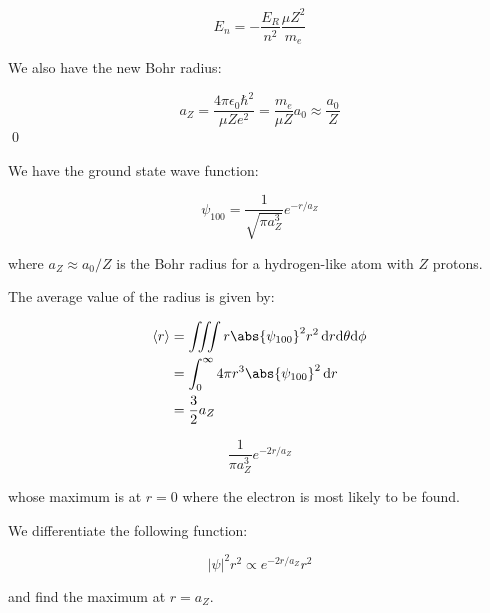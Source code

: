 \documentclass[12pt]{article}
\begin{document}
\begin{equation}
    E_{n} = - \frac{E_{R}}{n^{2}} \frac{\mu Z^{2}}{m_{e}}
\end{equation}

We also have the new Bohr radius:

\begin{equation}
    a_{Z} = \frac{4 \pi \epsilon_{0} \hbar^{2}}{\mu Z e^{2}} = \frac{m_{e}}{\mu Z} a_{0} \approx \frac{a_{0}}{Z}
\end{equation}
\qed


We have the ground state wave function:

\begin{equation}
    \psi_{100} = \frac{1}{\sqrt{\pi a_{Z}^{3}}} e^{-r/a_{Z}}
\end{equation}

where $a_{Z} \approx a_{0}/Z$ is the Bohr radius for a hydrogen-like atom with $Z$ protons.

The average value of the radius is given by:

\begin{equation}
    \begin{split}
        \left\langle r \right\rangle &= \iiint r \abs{\psi_{100}}^{2} r^{2} \, \mathrm{d}r \mathrm{d}\theta \mathrm{d}\phi \\
        &= \int_{0}^{\infty} 4 \pi r^{3} \abs{\psi_{100}}^{2} \, \mathrm{d}r \\
        &= \frac{3}{2} a_{Z}
    \end{split}
\end{equation}


\begin{equation}
    \frac{1}{\pi a_{Z}^{3}} e^{-2r/a_{Z}}
\end{equation}

whose maximum is at $r = 0$ where the electron is most likely to be found.

\begin{correction}
    We differentiate the following function:

    \begin{equation}
        \left\lvert \psi \right\rvert^{2} r^{2} \propto e^{-2r/a_{Z}} r^{2}
    \end{equation}

    and find the maximum at $r = a_{Z}$.
\end{correction}
\end{document}
